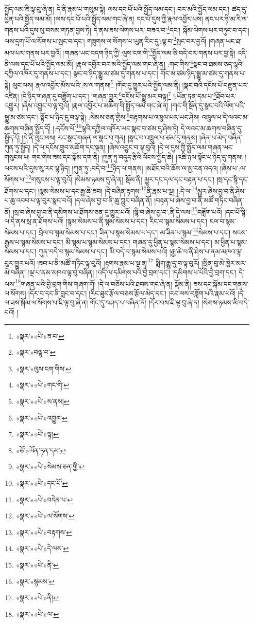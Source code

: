 སྤྱོད་ལམ་ཇི་ལྟ་བུ་ཞེ་ན། དེ་ནི་རྣམ་པ་གསུམ་སྟེ། ལས་དང་པོ་པའི་སྤྱོད་ལམ་དང་། བར་མའི་སྤྱོད་ལམ་དང་། ཚད་དུ་ཕྱིན་པའི་སྤྱོད་ལམ་མོ། །ལས་དང་པོ་པའི་སྤྱོད་ལམ་གང་ཞེ་ན། དང་པོ་དུས་ཀྱི་རྣལ་འབྱོར་པས། ནང་པར་ཉི་མ་རི་ལ་གནས་པའི་དུས་སུ་བསམ་གཏན་བྱས་ཏེ། དེ་ནས་ཟས་ལེགས་པར་:བཟའ་བ་\footnote{«སྣར་»«པེ་»ཟ་བ་}དང་། སྐོམ་ལེགས་པར་བཏུང་བ་དང་། ལས་དྲག་པོ་ལ་སོགས་པ་སྤང་བ་དང་། གཟུགས་ལ་སོགས་པ་ཡུན་རིང་དུ་:ལྟ་བ་\footnote{«སྣར་»བལྟ་བ་}སྤང་བར་བྱའོ། །གཞན་ཡང་ཐ་མལ་པར་གནས་པར་བྱའོ། །གཞན་ཡང་བདག་ཉིད་ཀྱི་:ལུས་ངག་གི་\footnote{«སྣར་»ལུས་ངག་གིས་}སྤྱོད་ལམ་ཅི་བདེ་བར་གནས་པར་བྱ་སྟེ། འདི་ནི་ལས་དང་པོ་པའི་སྤྱོད་ལམ་མོ། །རྣལ་འབྱོར་བར་མའི་སྤྱོད་ལམ་གང་ཞེ་ན། :གང་གིས་\footnote{«སྣར་»«པེ་»གང་གི་}སྣང་བ་ཐམས་ཅད་ལྷའི་དཀྱིལ་འཁོར་དུ་གནས་པ་དང་། སྣང་བ་ཉིད་སྒྱུ་མ་ཙམ་དུ་གནས་པ་དང་། གོང་མ་ཙམ་ཉིད་སྒྱུ་མ་ཙམ་དུ་གནས་པ་སྟེ། ལུང་ལས། རྣལ་འབྱོར་མོས་པའི་:ས་ལ་གནས།\footnote{«སྣར་»«པེ་»ས་ནས།} །གོང་དུ་གྱུར་པའི་སྤྱོད་ལམ་ནི། །སྣང་བའི་དངོས་པོ་བརྫུན་པར་འཛིན། །དེ་ཉིད་གཞན་དུ་བཟློག་པ་དང་། །གཞན་གྱུར་\footnote{«སྣར་»«པེ་»འགྱུར་}དངོས་པོ་སྒྱུ་མར་བལྟ།\footnote{«སྣར་»«པེ་»ལྟ།} །:ཡོན་ཏན་དམ་པ་\footnote{«ཅོ་»ཡོན་ཏན་དམ་}ཐོབ་པར་འགྱུར། །ཞེས་འབྱུང་བ་ལྟ་བུའོ། །རྣལ་འབྱོར་པ་མཆོག་གི་སྤྱོད་ལམ་གང་ཞེ་ན། །གང་གི་སྔོན་དུ་སྣང་བའི་ལོག་པའི་སྒྱུ་མ་ཙམ་དང་། སྟོང་པ་ཉིད་དུ་བལྟ་སྟེ། :སེམས་ཅན་གྱིས་\footnote{«སྣར་»«པེ་»སེམས་ཅན་གྱི་}བརྟགས་པ་འཁྲུལ་པར་ཡང་ཤེས། འཁྲུལ་པ་དེ་ལའང་མ་ཆགས་བཞིན་སྤྱོད་དོ། །:དངོས་པོ་\footnote{«སྣར་»«པེ་»དང་པོ་}ལྷའི་དཀྱིལ་འཁོར་ཡང་སྣང་བ་ཙམ་དུ་ཤེས་ཏེ། དེ་ལའང་མ་ཆགས་བཞིན་དུ་སྤྱོད་དོ། །དེ་ནི་ལུང་ལས། རང་སྣང་གཞན་ལ་སྣང་བ་ཀུན། །སྣང་བ་འཁྲུལ་པ་ཙམ་དུ་གནས། །ཞེན་པ་མེད་བཞིན་ཀུན་ཏུ་སྤྱོད། །དེ་ལ་དངོས་གྲུབ་མཆོག་དང་ལྡན། །ཞེས་འབྱུང་བ་ལྟ་བུའོ། །དེ་ལ་དུས་ཀྱི་སྤྱོད་ལམ་གཞན་ཡང་གསུངས་པ། གང་གིས་ཟས་དང་སྐོམ་དག་ནི། །ཀུན་ཏུ་བདུད་རྩིའི་ལོངས་སྤྱོད་ཆེ། །འཆི་ཉལ་སྟོང་པ་ཉིད་དུ་གནས། །ལངས་པའི་དུས་སུ་རང་ལྷ་ཉིད། །ཀུན་ཏུ་:བདེ་བ་\footnote{«སྣར་»«པེ་»བདེན་པ་}ཉིད་ལ་གནས། །མཐོང་བའི་ཆོས་ལ་མྱ་ངན་འདའ། །ཞེས་པ་:ལ་སོགས་པ་\footnote{«སྣར་»«པེ་»ལ་སོགས་}གསུངས་པ་ལྟ་བུའོ། །སེམས་ཉམས་དུ་ཞེ་ན། སྡོམ་ནི། མྱུར་དང་དལ་དང་བརྟན་པ་དང་། །སྲ་དང་སྙི་དང་ཐོགས་པ་དང་། །སྙམ་སེམས་པ་དང་རྒྱ་ཆེ་ཟབ། །དེ་བཞིན་རྟགས་\footnote{«སྣར་»«པེ་»བརྟགས་}ནི་རྣམ་པ་ལྔ། །:དེ་ལ་\footnote{«སྣར་»«པེ་»དེ་ལས་}མྱུར་ཞེས་བྱ་བ་ནི་ཤེས་པ་ཆུ་འབབ་པ་ལྟ་བུར་སྣང་བའོ། །དལ་ཞེས་བྱ་བ་ནི་ཆུ་ཀླུང་བཞིན་ནོ། །བརྟན་པ་ཞེས་བྱ་བ་ནི་མཚོ་གཏིང་བཞིན་ནོ། །སྲ་བ་ཞེས་བྱ་བ་ནི་དམིགས་པ་ཐོགས་ཅན་དུ་གྱུར་པའོ། །སྙི་བ་ཞེས་བྱ་བ་:ནི་དེ་ལས་\footnote{«སྣར་»«པེ་»ནི་}བཟློག་པའོ། །དང་པོ་སྙི་ལ་དེ་ནས་སྲ་ན་ཐོགས་པའོ། །སྙམ་སེམས་པ་ནི་སྙམ་སེམས་པ་དང་། རིང་བ་སྙམ་སེམས་པ་དང་། ངལ་བ་སྙམ་སེམས་པ་དང་། བྲེལ་བ་སྙམ་སེམས་པ་དང་། ཟིན་པ་སྙམ་སེམས་པ་དང་། མ་ཟིན་པ་སྙམ་\footnote{«སྣར་»སྙམས་}སེམས་པ་དང་། སངས་རྒྱས་པ་སྙམ་སེམས་པ་དང་། མི་སྙམ་པ་སྙམ་སེམས་པ་དང་། གཞན་དུ་ཕྱིན་པ་སྙམ་སེམས་པ་དང་། མ་ཕྱིན་པ་སྙམ་སེམས་པ་དང་། ཀུན་བདེ་བ་སྙམ་སེམས་པ་དང་། མི་བདེ་བ་སྙམ་སེམས་པའོ། །རྒྱ་ཆེ་བ་ནི་ཤེས་པ་ནམ་མཁའ་ལྟ་བུར་གྱུར་པའོ། །ཟབ་པ་ནི་མཚོ་གཏིང་ལྟ་བུའོ། །རྟགས་རྣམ་པ་ལྔ་ན།\footnote{«སྣར་»«པེ་»ནི།} སྨིག་རྒྱུ་དུ་བ་ལྟ་བུའོ། །སྲིན་བུ་མེ་ཁྱེར་མར་མེ་བཞིན། །ལྔ་པ་ནམ་མཁའ་ལྟ་བུ་བཞིན། །འདི་ལ་དམིགས་པའི་བྱེ་བྲག་དང་། །དམིགས་པ་པོའི་བྱེ་བྲག་དང་། དེ་ལས་\footnote{«སྣར་»«པེ་»ལ་}གཞན་པའི་བྱེ་བྲག་གིས་གཞག་གོ། །དེ་ལ་བཅོས་པའི་ཐབས་གང་ཞེ་ན། སྡོམ་ནི། ཟས་དང་སྐོམ་དང་གནས་ལ་སོགས། །དོར་བ་དང་ནི་བླང་བ་དང་། །རིང་ཐུང་རྩོལ་བཅས་རྩོལ་མེད་དང་། །རང་ལས་བཟློག་པའི་རྣམ་པའོ། །དེ་ལ་ཟས་སྐོམ་ལ་སོགས་པ་ཇི་ལྟ་བུ་ཞེ་ན། གོང་དུ་བཤད་པ་བཞིན་ནོ། །དོར་བས་ཇི་ལྟ་བུ་ཞེ་ན། །སེམས་ཉམས་མི་བདེ་བའོ། །
